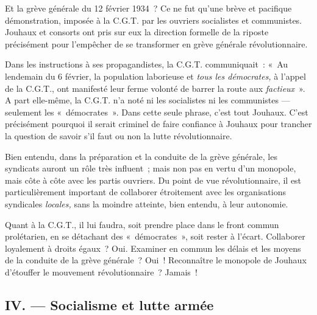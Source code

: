 \documentclass[french,twoside]{book} %
\begin{document}
Et la grève générale du 12 février 1934 ? Ce ne fut qu’une brève et pacifique démonstration, imposée à la C.G.T. par les ouvriers socialistes et communistes. Jouhaux et consorts ont pris sur eux la direction formelle de la riposte précisément pour l’empêcher de se transformer en grève générale révolutionnaire.\par
Dans les instructions à ses propagandistes, la C.G.T. communiquait : « Au lendemain du 6 février, la population laborieuse et \emph{tous les démocrates,} à l’appel de la C.G.T., ont manifesté leur ferme volonté de barrer la route aux \emph{factieux} ». A part elle-même, la C.G.T. n’a noté ni les socialistes ni les communistes — seulement les « démocrates ». Dans cette seule phrase, c’est tout Jouhaux. C’est précisément pourquoi il serait criminel de faire confiance à Jouhaux pour trancher la question de savoir s’il faut ou non la lutte révolutionnaire.\par
 Bien entendu, dans la préparation et la conduite de la grève générale, les syndicats auront un rôle très influent ; mais non pas en vertu d’un monopole, mais côte à côte avec les partis ouvriers. Du point de vue révolutionnaire, il est particulièrement important de collaborer étroitement avec les organisations syndicales \emph{locales,} sans la moindre atteinte, bien entendu, à leur autonomie.\par
Quant à la C.G.T., il lui faudra, soit prendre place dans le front commun prolétarien, en se détachant des « démocrates », soit rester à l’écart. Collaborer loyalement à droits égaux ? Oui. Examiner en commun les délais et les moyens de la conduite de la grève générale ? Oui ! Reconnaître le monopole de Jouhaux d’étouffer le mouvement révolutionnaire ? Jamais !
\subsection[{IV. — Socialisme et lutte armée}]{IV. — Socialisme et lutte armée}
\end{document}
